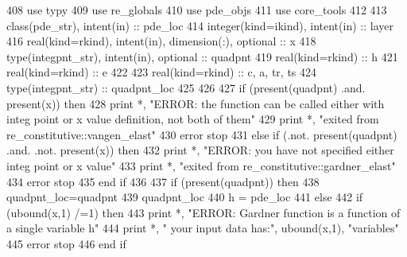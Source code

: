 \begin{DoxyCode}
408       \textcolor{keywordtype}{use }typy
409       \textcolor{keywordtype}{use }re_globals
410       \textcolor{keywordtype}{use }pde_objs
411       \textcolor{keywordtype}{use }core_tools
412 
413       \textcolor{keywordtype}{class}(pde_str), \textcolor{keywordtype}{intent(in)} :: pde\_loc 
414       \textcolor{keywordtype}{integer(kind=ikind)}, \textcolor{keywordtype}{intent(in)} :: layer
416       \textcolor{keywordtype}{real(kind=rkind)}, \textcolor{keywordtype}{intent(in)}, \textcolor{keywordtype}{dimension(:)},  \textcolor{keywordtype}{optional} :: x
418       \textcolor{keywordtype}{type}(integpnt_str), \textcolor{keywordtype}{intent(in)}, \textcolor{keywordtype}{optional} :: quadpnt
419       \textcolor{keywordtype}{real(kind=rkind)} :: h
421       \textcolor{keywordtype}{real(kind=rkind)} :: e
422 
423       \textcolor{keywordtype}{real(kind=rkind)} :: c, a,  tr, ts 
424       \textcolor{keywordtype}{type}(integpnt_str) :: quadpnt\_loc      
425           
426       
427       \textcolor{keywordflow}{if} (\textcolor{keyword}{present}(quadpnt) .and. \textcolor{keyword}{present}(x)) \textcolor{keywordflow}{then}
428         print *, \textcolor{stringliteral}{"ERROR: the function can be called either with integ point or x value definition, not both
       of them"}
429         print *, \textcolor{stringliteral}{"exited from re\_constitutive::vangen\_elast"}
430         error stop
431       \textcolor{keywordflow}{else} \textcolor{keywordflow}{if} (.not. \textcolor{keyword}{present}(quadpnt) .and. .not. \textcolor{keyword}{present}(x)) \textcolor{keywordflow}{then}
432         print *, \textcolor{stringliteral}{"ERROR: you have not specified either integ point or x value"}
433         print *, \textcolor{stringliteral}{"exited from re\_constitutive::gardner\_elast"}
434         error stop
435 \textcolor{keywordflow}{      end if}
436       
437       \textcolor{keywordflow}{if} (\textcolor{keyword}{present}(quadpnt)) \textcolor{keywordflow}{then}
438         quadpnt\_loc=quadpnt
439         quadpnt\_loc%
440         h = pde\_loc%
441       \textcolor{keywordflow}{else}
442         \textcolor{keywordflow}{if} (ubound(x,1) /=1) \textcolor{keywordflow}{then}
443           print *, \textcolor{stringliteral}{"ERROR: Gardner function is a function of a single variable h"}
444           print *, \textcolor{stringliteral}{"       your input data has:"}, ubound(x,1), \textcolor{stringliteral}{"variables"}
445           error stop
446 \textcolor{keywordflow}{        end if}

\end{DoxyCode}
